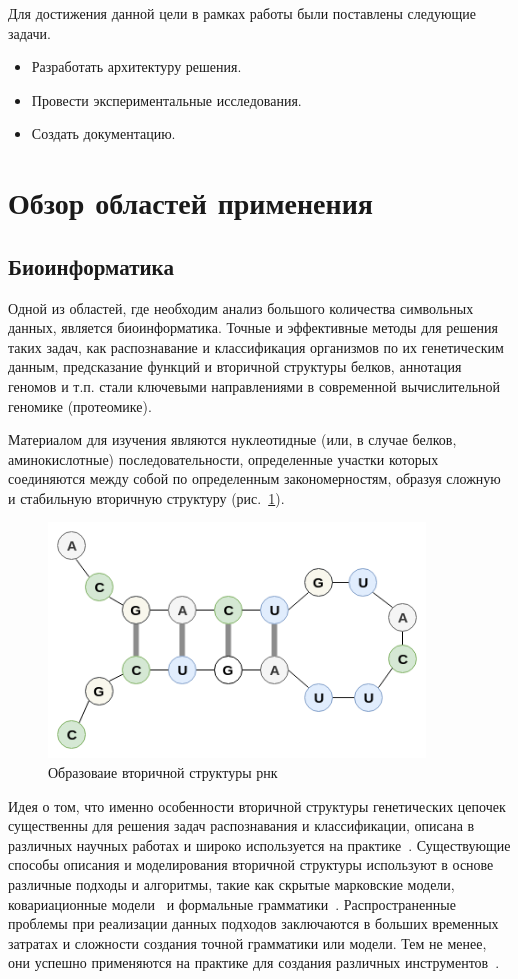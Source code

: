 \documentclass[14pt]{matmex-diploma-custom}
\begin{document}
Для достижения данной цели в рамках работы были поставлены следующие задачи.
\begin{itemize}
    \item Разработать архитектуру решения.
    \item Провести экспериментальные исследования.
    \item Создать документацию.
\end{itemize}

\section{Обзор областей применения}
\subsection{Биоинформатика}
Одной из областей, где необходим анализ большого количества символьных данных, является биоинформатика. Точные и эффективные методы для решения таких задач, как распознавание и классификация организмов по их генетическим данным, предсказание функций и вторичной структуры белков, аннотация геномов и т.п. стали ключевыми направлениями в современной вычислительной геномике (протеомике). 

Материалом для изучения являются нуклеотидные (или, в случае белков, аминокислотные) последовательности, определенные участки которых соединяются между собой по определенным закономерностям, образуя сложную и стабильную вторичную структуру (рис.~\ref{molekula}).

\begin{figure}[h]
\begin{center}
\centering
\includegraphics[width=10cm]{molekula.png}
\caption{Образоваие вторичной структуры рнк}
\label{molekula}
\end{center}
\end{figure}    
Идея о том, что именно особенности вторичной структуры генетических цепочек существенны для решения задач распознавания и классификации, описана в различных научных работах и широко используется на практике~\cite{miladi2017rnascclust, vrehakova2014variation}.
Существующие способы описания и моделирования вторичной структуры используют в основе различные подходы и алгоритмы, такие как скрытые марковские модели, ковариационные модели~\cite{EddyDurbin} и формальные грамматики~\cite{GrammarsRNA,PCFG,LWPCFG}. Распространенные проблемы при реализации данных подходов заключаются в больших временных затратах и сложности создания точной грамматики или модели. Тем не менее, они успешно применяются на практике для создания различных инструментов~\cite{hmmer,infernal}.
\end{document}
